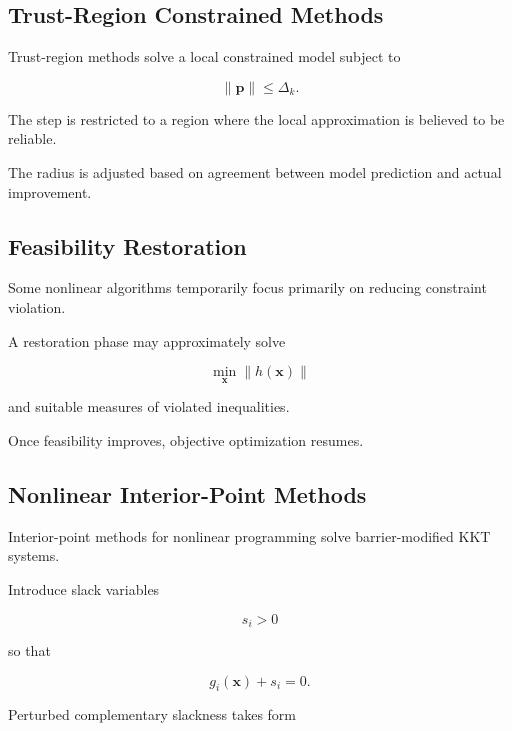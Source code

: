 \subsection{Trust-Region Constrained Methods}
\label{subsec:nlp-trust-region}

Trust-region methods solve a local constrained model subject to

\[
\boxed{
\|\mathbf{p}\|
\leq
\Delta_k.
}
\]

The step is restricted to a region where the local approximation is
believed to be reliable.

The radius is adjusted based on agreement between model prediction and
actual improvement.

\subsection{Feasibility Restoration}
\label{subsec:feasibility-restoration}

Some nonlinear algorithms temporarily focus primarily on reducing
constraint violation.

A restoration phase may approximately solve

\[
\boxed{
\min_{\mathbf{x}}
\|
h(\mathbf{x})
\|
}
\]

and suitable measures of violated inequalities.

Once feasibility improves, objective optimization resumes.

\subsection{Nonlinear Interior-Point Methods}
\label{subsec:nonlinear-interior-point}

Interior-point methods for nonlinear programming solve barrier-modified
KKT systems.

Introduce slack variables

\[
s_i>0
\]

so that

\[
\boxed{
g_i(\mathbf{x})+s_i=0.
}
\]

Perturbed complementary slackness takes form

